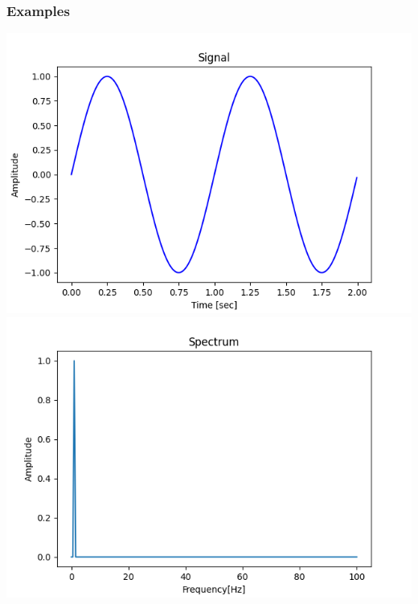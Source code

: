 \documentclass{beamer}
\begin{document}
\begin{frame}
	\frametitle{Examples}
\includegraphics[scale = 0.35]{media/signal1.png}
\includegraphics[scale = 0.35]{media/fourier1.png}	
\end{frame}
\end{document}
